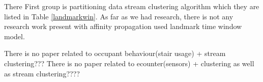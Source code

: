 \documentclass[../UNBThesis2.tex]{subfiles}
\begin{document}
\begin{itemize}[leftmargin=*]








\end{itemize}


There First group is partitioning data stream clustering algorithm which they are listed in Table \ref{landmarkwin}. As far as we had research, there is not any research work present with affinity propagation used landmark time window model.

There is no paper related to occupant behaviour(stair usage) + stream clustering???
There is no paper related to ecounter(sensors) + clustering as well as stream clustering????
\end{document}
